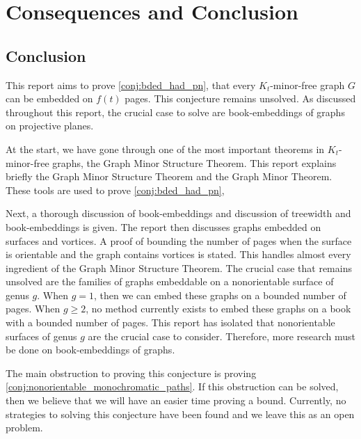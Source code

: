 \chapter{Consequences and Conclusion}\label{chap:conclusion}



\section{Conclusion}
This report aims to prove \cref{conj:bded_had_pn}, that every $K_t$-minor-free graph $G$ can be embedded on $f(t)$ pages. This conjecture remains unsolved. 
As discussed throughout this report, the crucial case to solve are book-embeddings of graphs on projective planes. 

At the start, we have gone through one of the most important theorems in $K_t$-minor-free graphs, the Graph Minor Structure Theorem. This report explains briefly the Graph Minor Structure Theorem and the Graph Minor Theorem. 
These tools are used to prove \cref{conj:bded_had_pn},

Next, a thorough discussion of book-embeddings and discussion of treewidth and book-embeddings is given. The report then discusses graphs embedded on surfaces and vortices. A proof of bounding the number of pages when the surface is orientable and the graph contains vortices is stated. This handles almost every ingredient of the Graph Minor Structure Theorem. The crucial case that remains unsolved are the families of graphs embeddable on a nonorientable surface of genus $g$. When $g = 1$, then we can embed these graphs on a bounded number of pages. When $g \geq 2$, no method currently exists to embed these graphs on a book with a bounded number of pages. This report has isolated that nonorientable surfaces of genus $g$ are the crucial case to consider. Therefore, more research must be done on book-embeddings of graphs. 

The main obstruction to proving this conjecture is proving \cref{conj:nonorientable_monochromatic_paths}. If this obstruction can be solved, then we believe that we will have an easier time proving a bound. Currently, no strategies to solving this conjecture have been found and we leave this as an open problem. 
